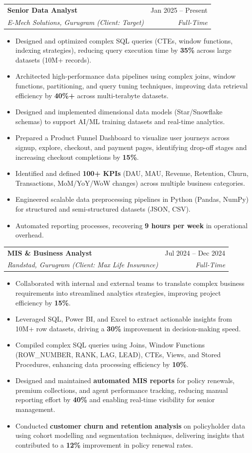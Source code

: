 \documentclass[letterpaper,11pt]{article}
\makeatletter
\newcommand{\resumeItem}[1]{
  \item\small{#1 \vspace{-2pt}}
}
\newcommand{\resumeSubheading}[4]{
  \vspace{-2pt}\item
    \begin{tabular*}{0.97\textwidth}[t]{l@{\extracolsep{\fill}}r}
      \textbf{#1} & #2 \\
      \textit{\small#3} & \textit{\small #4} \\
    \end{tabular*}\vspace{-7pt}
}
\newcommand{\resumeItemListStart}{\begin{itemize}}
\newcommand{\resumeItemListEnd}{\end{itemize}\vspace{-5pt}}
\makeatother
\begin{document}
    \resumeSubheading
      {Senior Data Analyst}{Jan 2025 -- Present}
      {E-Mech Solutions, Gurugram \textnormal{\small(Client: Target)}}{Full-Time}
      \resumeItemListStart
        \resumeItem{Designed and optimized complex SQL queries (CTEs, window functions, indexing strategies), reducing query execution time by \textbf{35\%} across large datasets (10M+ records).}
        \resumeItem{Architected high-performance data pipelines using complex joins, window functions, partitioning, and query tuning techniques, improving data retrieval efficiency by \textbf{40\%+} across multi-terabyte datasets.}
        \resumeItem{Designed and implemented dimensional data models (Star/Snowflake schemas) to support AI/ML training datasets and real-time analytics.}
        \resumeItem{Prepared a Product Funnel Dashboard to visualize user journeys across signup, explore, checkout, and payment pages, identifying drop-off stages and increasing checkout completions by \textbf{15\%}.}
        \resumeItem{Identified and defined \textbf{100+ KPIs} (DAU, MAU, Revenue, Retention, Churn, Transactions, MoM/YoY/WoW changes) across multiple business categories.}
        \resumeItem{Engineered scalable data preprocessing pipelines in Python (Pandas, NumPy) for structured and semi-structured datasets (JSON, CSV).}
        \resumeItem{Automated reporting processes, recovering \textbf{9 hours per week} in operational overhead.}
      \resumeItemListEnd

    \resumeSubheading
      {MIS \& Business Analyst}{Jul 2024 -- Dec 2024}
      {Randstad, Gurugram \textnormal{\small(Client: Max Life Insurance)}}{Full-Time}
      \resumeItemListStart
        \resumeItem{Collaborated with internal and external teams to translate complex business requirements into streamlined analytics strategies, improving project efficiency by \textbf{15\%}.}
        \resumeItem{Leveraged SQL, Power BI, and Excel to extract actionable insights from 10M+ row datasets, driving a \textbf{30\%} improvement in decision-making speed.}
        \resumeItem{Compiled complex SQL queries using Joins, Window Functions (ROW\_NUMBER, RANK, LAG, LEAD), CTEs, Views, and Stored Procedures, enhancing data processing efficiency by \textbf{10\%}.}
        \resumeItem{Designed and maintained \textbf{automated MIS reports} for policy renewals, premium collections, and agent performance tracking, reducing manual reporting effort by \textbf{40\%} and enabling real-time visibility for senior management.}
        \resumeItem{Conducted \textbf{customer churn and retention analysis} on policyholder data using cohort modelling and segmentation techniques, delivering insights that contributed to a \textbf{12\%} improvement in policy renewal rates.}
      \resumeItemListEnd
\end{document}
